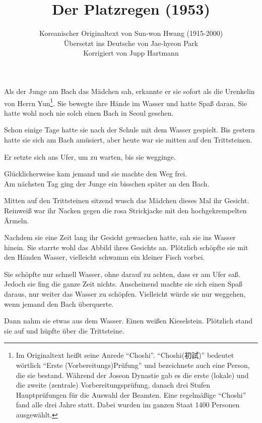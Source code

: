 \documentclass[prd,12pt,tightenlines,notitlepage,nofootinbib]{revtex4-1}
\begin{document}
\title{Der Platzregen (1953)}
\author{Koreanischer Originaltext von Sun-won Hwang (1915-2000)
\\ Übersetzt ins Deutsche von Jae-hyeon Park
\\ Korrigiert von Jupp Hartmann}
\maketitle

\noindent
Als der Junge am Bach das Mädchen sah, erkannte er sie sofort als die
Urenkelin von Herrn Yun\footnote{Im Originaltext heißt seine Anrede "`Choshi"'.
"`Choshi({初試})"' bedeutet wörtlich "`Erste (Vorbereitungs)Prüfung"' und
bezeichnete auch eine Person, die sie bestand.
Während der Joseon Dynastie gab es
die erste (lokale) und die zweite (zentrale) Vorbereitungsprüfung,
danach drei Stufen Hauptprüfungen für die Auswahl der Beamten.
Eine regelmäßige "`Choshi"' fand alle drei Jahre statt. Dabei wurden
im ganzen Staat 1400 Personen ausgewählt.}.
Sie bewegte ihre Hände im Wasser und hatte
Spaß daran.  Sie hatte wohl noch nie solch einen Bach in Seoul gesehen.

Schon einige Tage hatte sie nach der Schule mit dem Wasser gespielt.
Bis gestern hatte sie sich am Bach amüsiert,
aber heute war sie mitten auf den Trittsteinen.

Er setzte sich ans Ufer, um zu warten, bis sie wegginge.

Glücklicherweise kam
jemand und sie machte den Weg frei.
\\

Am nächsten Tag ging der Junge ein bisschen später an den Bach.

Mitten auf den Trittsteinen sitzend wusch das Mädchen dieses Mal ihr
Gesicht.  Reinweiß war ihr Nacken gegen die rosa
Strickjacke mit den hochgekrempelten Ärmeln.

Nachdem sie eine Zeit lang
ihr Gesicht gewaschen hatte, sah sie ins Wasser hinein.  Sie starrte wohl das
Abbild ihres Gesichts an.  Plötzlich schöpfte sie mit den Händen
Wasser, vielleicht schwamm ein kleiner Fisch vorbei.

Sie schöpfte nur schnell
Wasser, ohne darauf zu achten, dass er am Ufer saß.  Jedoch sie fing
die ganze Zeit nichts.  Anscheinend machte sie sich einen Spaß daraus,
nur weiter das Wasser zu schöpfen.  Vielleicht würde sie nur weggehen,
wenn jemand den Bach überquerte.

Dann nahm sie etwas aus dem Wasser.
Einen weißen Kieselstein.  Plötzlich stand sie auf und hüpfte über die
Trittsteine.
\end{document}
